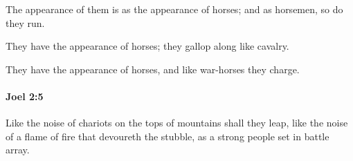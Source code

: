 			\begin{versebox}
					\item[BHS] 
					\item[LXX] 
					\item[ASV] The appearance of them is as the appearance of horses; and as horsemen, so do they run.
					\item[NIV] They have the appearance of horses; they gallop along like cavalry.
					\item[NRSV] They have the appearance of horses, and like war-horses they charge.
			\end{versebox}

		\paragraph{Joel 2:5} %
			\label{JOEL-2-5}

			Like the noise of chariots on the tops of mountains shall they leap, like the noise of a flame of fire that devoureth the stubble, as a strong people set in battle array.

